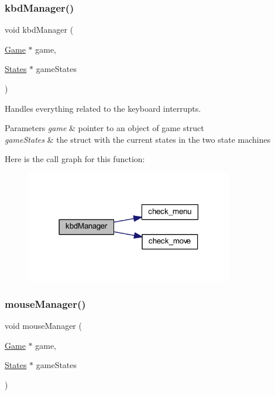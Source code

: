 \subsubsection{\texorpdfstring{kbd\+Manager()}{kbdManager()}}
{\footnotesize\ttfamily void kbd\+Manager (\begin{DoxyParamCaption}\item[{\hyperlink{struct_game}{Game} $\ast$}]{game,  }\item[{\hyperlink{struct_states}{States} $\ast$}]{game\+States }\end{DoxyParamCaption})}



Handles everything related to the keyboard interrupts. 


\begin{DoxyParams}{Parameters}
{\em game} & pointer to an object of game struct \\
\hline
{\em game\+States} & the struct with the current states in the two state machines \\
\hline
\end{DoxyParams}
Here is the call graph for this function\+:
\nopagebreak
\begin{figure}[H]
\begin{center}
\leavevmode
\includegraphics[width=258pt]{group___x_mas_run_gaa46516fec27d26c19d267394d5b2d9db_cgraph}
\end{center}
\end{figure}
\mbox{\label{group___x_mas_run_ga1b1dcdb3762a6408c2b5ad053e0848eb}} 
\subsubsection{\texorpdfstring{mouse\+Manager()}{mouseManager()}}
{\footnotesize\ttfamily void mouse\+Manager (\begin{DoxyParamCaption}\item[{\hyperlink{struct_game}{Game} $\ast$}]{game,  }\item[{\hyperlink{struct_states}{States} $\ast$}]{game\+States }\end{DoxyParamCaption})}



